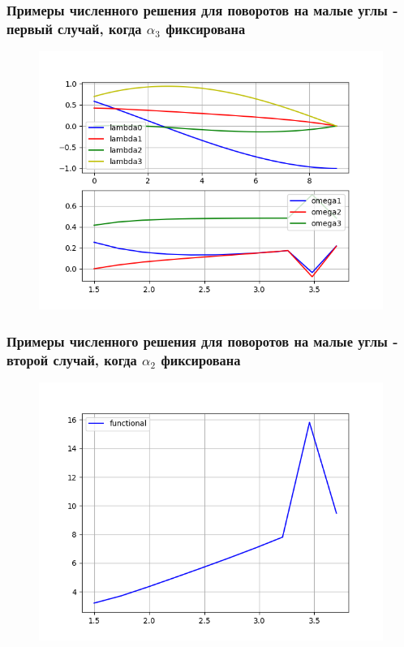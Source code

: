 \documentclass[10pt,utf8,presentation,notheorems,xcolor=dvipsnames,compress]{beamer}
\begin{document}
\begin{frame}
\frametitle{Примеры численного решения для поворотов на малые углы - первый случай, когда $\alpha_3$ фиксирована}
\begin{figure}[H]\label{one}
\center\includegraphics[scale=0.5]{fig/ivp_and_control_1_5-3_7_50.png}
\caption{}
\end{figure}
\end{frame}

\begin{frame}
\frametitle{Примеры численного решения для поворотов на малые углы - второй случай, когда $\alpha_2$ фиксирована}
\begin{figure}[H]\label{one}
\center\includegraphics[scale=0.5]{fig/functional_1_5-3_7_50.png}
\caption{}
\end{figure}
\end{frame}
\end{document}

